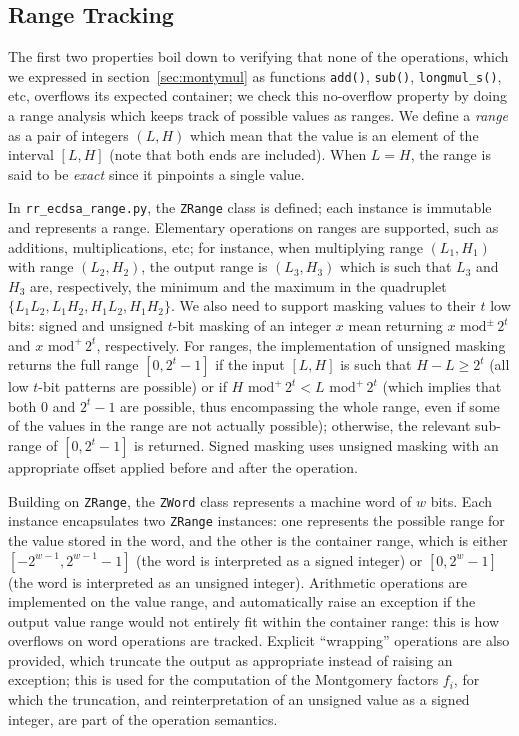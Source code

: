 \documentclass{llncs}
\newcommand{\umod}[2]{#1 \,\,\text{mod}^{+}\, #2}
\newcommand{\smod}[2]{#1 \,\,\text{mod}^{\pm}\, #2}
\begin{document}
\subsection{Range Tracking}

The first two properties boil down to verifying that none of the
operations, which we expressed in section~\ref{sec:montymul} as
functions \verb+add()+, \verb+sub()+, \verb+longmul_s()+, etc, overflows
its expected container; we check this no-overflow property by doing a
range analysis which keeps track of possible values as ranges.
We define a \emph{range} as a pair of integers $(L, H)$ which mean that
the value is an element of the interval $[L, H]$ (note that both ends
are included). When $L = H$, the range is said to be \emph{exact} since
it pinpoints a single value.

In \verb+rr_ecdsa_range.py+, the \verb+ZRange+ class is defined; each
instance is immutable and represents a range. Elementary operations on
ranges are supported, such as additions, multiplications, etc; for
instance, when multiplying range $(L_1, H_1)$ with range $(L_2, H_2)$,
the output range is $(L_3, H_3)$ which is such that $L_3$ and $H_3$ are,
respectively, the minimum and the maximum in the quadruplet $\{ L_1 L_2,
L_1 H_2, H_1 L_2, H_1 H_2 \}$. We also need to support masking values to
their $t$ low bits: signed and unsigned $t$-bit masking of an integer
$x$ mean returning $\smod{x}{2^t}$ and $\umod{x}{2^t}$, respectively.
For ranges, the implementation of unsigned masking returns the full
range $[0, 2^t - 1]$ if the input $[L, H]$ is such that $H - L \geq 2^t$
(all low $t$-bit patterns are possible) or if $\umod{H}{2^t} <
\umod{L}{2^t}$ (which implies that both $0$ and $2^t - 1$ are possible,
thus encompassing the whole range, even if some of the values in the
range are not actually possible); otherwise, the relevant sub-range of
$[0, 2^t - 1]$ is returned. Signed masking uses unsigned masking with an
appropriate offset applied before and after the operation.

Building on \verb+ZRange+, the \verb+ZWord+ class represents a machine
word of $w$ bits. Each instance encapsulates two \verb+ZRange+
instances: one represents the possible range for the value stored in the
word, and the other is the container range, which is either $[-2^{w-1},
2^{w-1} - 1]$ (the word is interpreted as a signed integer) or $[0, 2^w
- 1]$ (the word is interpreted as an unsigned integer). Arithmetic
operations are implemented on the value range, and automatically raise
an exception if the output value range would not entirely fit within the
container range: this is how overflows on word operations are tracked.
Explicit ``wrapping'' operations are also provided, which truncate the
output as appropriate instead of raising an exception; this is used for
the computation of the Montgomery factors $f_i$, for which the
truncation, and reinterpretation of an unsigned value as a signed
integer, are part of the operation semantics.
\end{document}
